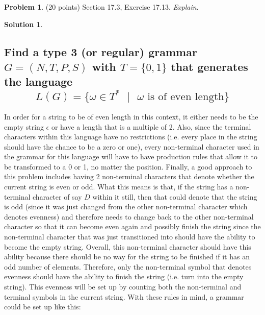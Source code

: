 \documentclass{article}
\theoremstyle{definition}
\newtheorem{problem}{Problem}
\newtheorem*{solution}{Solution}
\begin{document}
\newpage
\begin{problem} (20 points) Section 17.3, Exercise 17.13.  \textit{Explain}.
\end{problem}
\begin{solution}
\hspace{1cm}
\subsection*{Find a type 3 (or regular) grammar $G = (N,T,P,S)$ with $T = \{0,1\}$ that generates the language
$$ L(G) = \{\omega \in  T^* \mbox{ }| \mbox{ }\omega \mbox{ is of even length}\} $$}
In order for a string to be of even length in this context, it either needs to be the empty string $\epsilon$ or have a length that is a multiple of 2. Also, since the terminal characters within this language have no restrictions (i.e. every place in the string should have the chance to be a zero or one), every non-terminal character used in the grammar for this language will have to have production rules that allow it to be transformed to a 0 or 1, no matter the position. Finally, a good approach to this problem includes having 2 non-terminal characters that denote whether the current string is even or odd. What this means is that, if the string has a non-terminal character of say $D$ within it still, then that could denote that the string is odd (since it was just changed from the other non-terminal character which denotes evenness) and therefore needs to change back to the other non-terminal character so that it can become even again and possibly finish the string since the non-terminal character that was just transitioned into should have the ability to become the empty string. Overall, this non-terminal character should have this ability because there should be no way for the string to be finished if it has an odd number of elements. Therefore, only the non-terminal symbol that denotes evenness should have the ability to finish the string (i.e. turn into the empty string). This evenness will be set up by counting both the non-terminal and terminal symbols in the current string. With these rules in mind, a grammar could be set up like this:


\end{solution}
\end{document}
